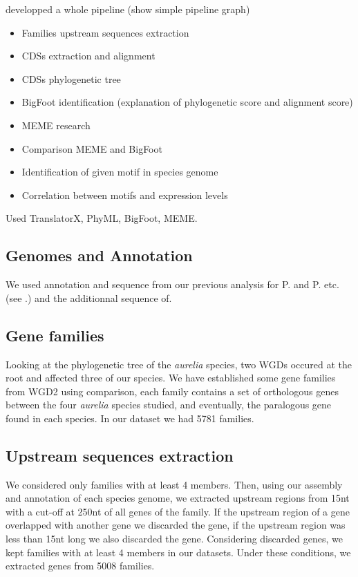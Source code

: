 developped a whole pipeline (show simple pipeline graph)
\begin{itemize}
\item Families upstream sequences extraction
\item CDSs extraction and alignment
\item CDSs phylogenetic tree
\item BigFoot identification (explanation of phylogenetic score and alignment score)
\item MEME research
\item Comparison MEME and BigFoot
\item Identification of given motif in species genome
\item Correlation between motifs and expression levels
\end{itemize}

Used TranslatorX, PhyML, BigFoot, MEME.

\subsection{Genomes and Annotation}

We used annotation and sequence from our previous analysis for P. and P. etc. (see .) and the additionnal sequence of.

\subsection{Gene families}

Looking at the phylogenetic tree of the \textit{aurelia} species, two WGDs occured at the root and affected three of our species. We have established some gene families from WGD2 using comparison, each family contains a set of orthologous genes between the four \textit{aurelia} species studied, and eventually, the paralogous gene found in each species. In our dataset we had 5781 families.

\subsection{Upstream sequences extraction}

We considered only families with at least 4 members. Then, using our assembly and annotation of each species genome, we extracted upstream regions from 15nt with a cut-off at 250nt of all genes of the family. If the upstream region of a gene overlapped with another gene we discarded the gene, if the upstream region was less than 15nt long we also discarded the gene. Considering discarded genes, we kept families with at least 4 members in our datasets. Under these conditions, we extracted genes from 5008 families.

